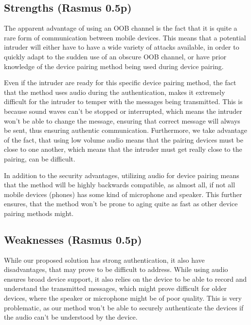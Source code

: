 \documentclass[12pt]{article}
\begin{document}
\newpage

\subsection{Strengths (Rasmus 0.5p)}
\label{sub:Strengths}

The apparent advantage of using an OOB channel is the fact that it is quite a rare form of communication between mobile devices. This means that a potential intruder will either have to have a wide variety of attacks available, in order to quickly adapt to the sudden use of an obscure OOB channel, or have prior knowledge of the device pairing method being used during device pairing.

Even if the intruder are ready for this specific device pairing method, the fact that the method uses audio during the authentication, makes it extremely difficult for the intruder to temper with the messages being transmitted. This is because sound waves can't be stopped or interrupted, which means the intruder won't be able to change the message, ensuring that correct message will always be sent, thus ensuring authentic communication. Furthermore, we take advantage of the fact, that using low volume audio means that the pairing devices must be close to one another, which means that the intruder must get really close to the pairing, can be difficult.

In addition to the security advantages, utilizing audio for device pairing means that the method will be highly backwards compatible, as almost all, if not all mobile devices (phones) has some kind of microphone and speaker. This further ensures, that the method won't be prone to aging quite as fast as other device pairing methods might.


\subsection{Weaknesses (Rasmus 0.5p)}
\label{sub:Weaknesses}

While our proposed solution has strong authentication, it also have disadvantages, that may prove to be difficult to address. While using audio ensures broad device support, it also relies on the device to be able to record and understand the transmitted messages, which might prove difficult for older devices, where the speaker or microphone might be of poor quality. This is very problematic, as our method won't be able to securely authenticate the devices if the audio can't be understood by the device.
\end{document}
